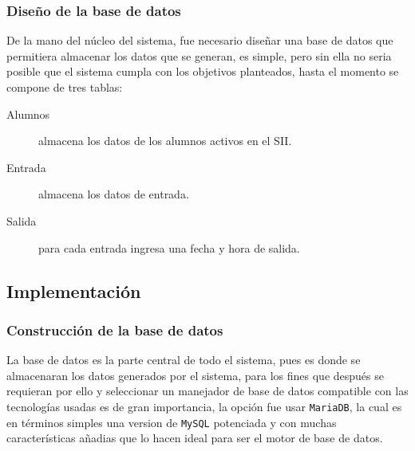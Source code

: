 \documentclass[12pt]{article} %
\begin{document}
		\subsubsection[Base de datos]{Dise\~no de la base de datos}
			De la mano del núcleo del sistema, fue necesario dise\~nar una base de datos que permitiera almacenar los datos que se generan, es simple, pero sin ella no seria
			posible que el sistema cumpla con los objetivos planteados, hasta el momento se compone de tres tablas:
			\begin{description}
				\item[Alumnos] almacena los datos de los alumnos activos en el SII.
				\item[Entrada] almacena los datos de entrada.
				\item[Salida] para cada entrada ingresa una fecha y hora de salida.
			\end{description}

  \newpage  
  \subsection{Implementaci\'on}
		
	\subsubsection[Base de datos]{Construcci\'on de la base de datos}
		La base de datos es la parte central de todo el sistema, pues es donde se almacenaran los datos generados por el sistema, para los fines que después se requieran
		por ello y seleccionar un manejador de base de datos compatible con las tecnologías usadas es de gran importancia, la opción fue usar \texttt{MariaDB}, la cual es
		en términos simples una version de \texttt{MySQL} potenciada y con muchas características a\~nadias que lo hacen ideal para ser el motor de base de datos.
		
\end{document}
